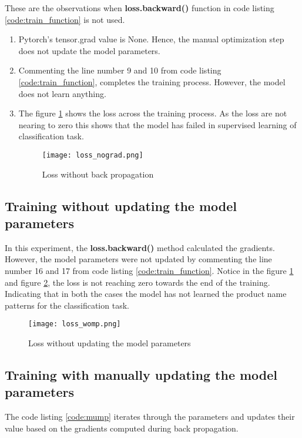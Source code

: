 These are the observations when \textbf{loss.backward()} function in code listing \ref{code:train_function} is not used.

\begin{enumerate}
    \item Pytorch's tensor.grad value is None. Hence, the manual optimization step does not update the model parameters.
    \item Commenting the line number 9 and 10 from code listing \ref{code:train_function}, completes the training process. However, the model does not learn anything.  
    \item The figure \ref{fig:nograd} shows the loss across the training process. As the loss are not nearing to zero this shows that the model has failed in supervised learning of classification task.
    \begin{figure}[H]
        \centering    
        \texttt{[image: loss\_nograd.png]}
        \caption{Loss without back propagation}
        \label{fig:nograd}
    \end{figure}
    
\end{enumerate}


\subsection*{Training without updating the model parameters}
In this experiment, the \textbf{loss.backward()} method calculated the gradients. However, the model parameters were not updated by commenting the line number 16 and 17 from code listing \ref{code:train_function}. Notice in the figure \ref{fig:nograd} and figure \ref{fig:womp}, the loss is not reaching zero towards the end of the training. Indicating that in both the cases the model has not learned the product name patterns for the classification task.

\begin{figure}[H]
    \centering    
    \texttt{[image: loss\_womp.png]}
    \caption{Loss without updating the model parameters}
    \label{fig:womp}
\end{figure}

\subsection{Training with manually updating the model parameters} \label{sec:tmump}

The code listing \ref{code:mump} iterates through the parameters and updates their value based on the gradients computed during back propagation. 

